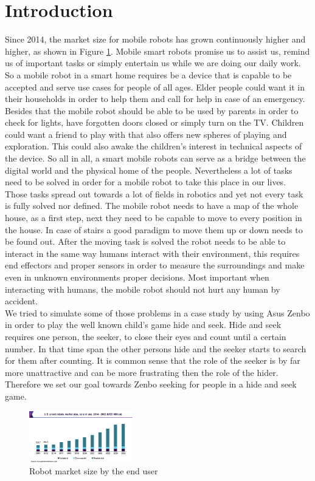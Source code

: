 \documentclass[conference]{IEEEtran}
\begin{document}
\section{Introduction}
Since 2014, the market size for mobile robots has grown continuously higher and higher, as shown in Figure \ref{fig:robotmarket}.
Mobile smart robots promise us to assist us, remind us of important tasks or simply entertain us while we are doing our daily work.
So a mobile robot in a smart home requires be a device that is capable to be accepted and serve use cases for people of all ages.
Elder people could want it in their households in order to help them and call for help in case of an emergency.
Besides that the mobile robot should be able to be used by parents in order to check for lights, have forgotten doors closed
or simply turn on the TV. 
Children could want a friend to play with that also offers new spheres of playing and exploration. 
This could also awake the children's interest in technical aspects of the device. 
So all in all, a smart mobile robots can serve as a bridge between the digital world and the physical home of the people.
Nevertheless a lot of tasks need to be solved in order for a mobile robot to take this place in our lives.\\
Those tasks spread out towards a lot of fields in robotics and yet not every task is fully solved nor defined. 
The mobile robot needs to have a map of the whole house, as a first step, next they need to be capable to move to every position in the house.
In case of stairs a good paradigm to move them up or down needs to be found out.
After the moving task is solved the robot needs to be able to interact in the same way humans interact with their environment, 
this requires end effectors and proper sensors in order to measure the surroundings and make even in unknown environments proper decisions.
Most important when interacting with humans, the mobile robot should not hurt any human by accident.\\
We tried to simulate some of those problems in a case study by using Asus Zenbo in order to play the well known child's game hide and seek.
Hide and seek requires one person, the seeker, to close their eyes and count until a certain number. 
In that time span the other persons hide and the seeker starts to search
for them after counting. It is common sense that the role of the seeker is by far more unattractive and can be more frustrating
then the role of the hider. Therefore we set our goal towards Zenbo seeking for people in a hide and seek game. \\
\begin{figure}[h]  \label{fig:robotmarket}
	\begin{center}
		\includegraphics[width=0.4\textwidth]{pics/robotMarket.png}
	\end{center}
	\caption{Robot market size by the end user \cite{b0}}
\end{figure}\\\\
\end{document}
